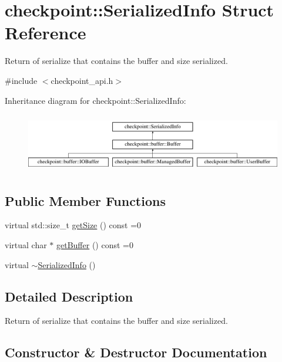 \hypertarget{structcheckpoint_1_1_serialized_info}{}\section{checkpoint\+:\+:Serialized\+Info Struct Reference}
\label{structcheckpoint_1_1_serialized_info}


Return of serialize that contains the buffer and size serialized.  




{\ttfamily \#include $<$checkpoint\+\_\+api.\+h$>$}

Inheritance diagram for checkpoint\+:\+:Serialized\+Info\+:\begin{figure}[H]
\begin{center}
\leavevmode
\includegraphics[height=2.604651cm]{structcheckpoint_1_1_serialized_info}
\end{center}
\end{figure}
\subsection*{Public Member Functions}
\begin{DoxyCompactItemize}
\item 
virtual std\+::size\+\_\+t \hyperlink{structcheckpoint_1_1_serialized_info_a7550340904d20dd612100fb37d1d4452}{get\+Size} () const =0
\item 
virtual char $\ast$ \hyperlink{structcheckpoint_1_1_serialized_info_aa941e773b665a69a856996d243e7f2c7}{get\+Buffer} () const =0
\item 
virtual \hyperlink{structcheckpoint_1_1_serialized_info_aca442bb41f5c514fb79b776f5baaa0c1}{$\sim$\+Serialized\+Info} ()
\end{DoxyCompactItemize}


\subsection{Detailed Description}
Return of serialize that contains the buffer and size serialized. 

\subsection{Constructor \& Destructor Documentation}
\mbox{\label{structcheckpoint_1_1_serialized_info_aca442bb41f5c514fb79b776f5baaa0c1}} 
